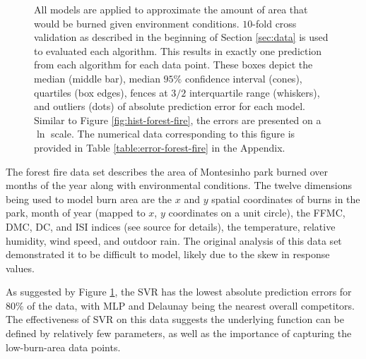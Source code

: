 \documentclass[smallextended,final]{svjour3}  %
\begin{document}
\begin{figure}
  \centering
  \caption{All models are applied to approximate the amount of area
    that would be burned given environment conditions. $10$-fold cross
    validation as described in the beginning of Section \ref{sec:data}
    is used to evaluated each algorithm. This results in exactly one
    prediction from each algorithm for each data point. These boxes
    depict the median (middle bar), median $95\%$ confidence interval
    (cones), quartiles (box edges), fences at $3/2$ interquartile
    range (whiskers), and outliers (dots) of absolute prediction error
    for each model. Similar to Figure \ref{fig:hist-forest-fire}, the
    errors are presented on a $\ln$ scale. The numerical data
    corresponding to this figure is provided in Table
    \ref{table:error-forest-fire} in the Appendix.}
  \label{fig:error-forest-fire}
\end{figure}


The forest fire data set \cite{cortez2007data} describes the area of
Montesinho park burned over months of the year along with
environmental conditions. The twelve dimensions being used to model
burn area are the $x$ and $y$ spatial coordinates of burns in the
park, month of year (mapped to $x$, $y$ coordinates on a unit circle),
the FFMC, DMC, DC, and ISI indices (see source for details), the
temperature, relative humidity, wind speed, and outdoor rain. The
original analysis of this data set demonstrated it to be difficult to
model, likely due to the skew in response values.

As suggested by Figure \ref{fig:error-forest-fire}, the SVR has the
lowest absolute prediction errors for $80\%$ of the data, with MLP and
Delaunay being the nearest overall competitors. The effectiveness of
SVR on this data suggests the underlying function can be defined by
relatively few parameters, as well as the importance of capturing the
low-burn-area data points.
\end{document}
